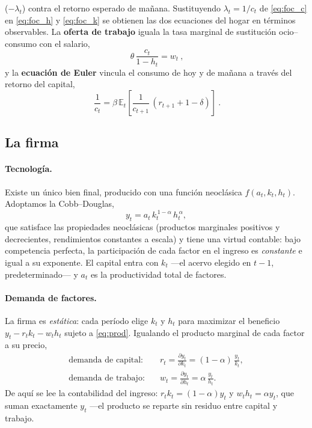 \documentclass[11pt,a4paper]{report}
\newcommand{\E}{\mathbb{E}}
\begin{document}
($-\lambda_t$) contra el retorno esperado de mañana. Sustituyendo $\lambda_t=1/c_t$ de
\eqref{eq:foc_c} en \eqref{eq:foc_h} y \eqref{eq:foc_k} se obtienen las dos ecuaciones
del hogar en términos observables. La \textbf{oferta de trabajo} iguala la tasa
marginal de sustitución ocio--consumo con el salario,
\begin{equation}
\boxed{\ \theta\,\frac{c_t}{1-h_t}=w_t\ }, \label{eq:laborsupply}
\end{equation}
y la \textbf{ecuación de Euler} vincula el consumo de hoy y de mañana a través del
retorno del capital,
\begin{equation}
\boxed{\ \frac{1}{c_t}=\beta\,\E_t\!\left[\frac{1}{c_{t+1}}\,(r_{t+1}+1-\delta)\right]\ }. \label{eq:euler}
\end{equation}

\subsection{La firma}
\label{sec:firma}

\paragraph{Tecnología.} Existe un único bien final, producido con una función
neoclásica $f(a_t,k_t,h_t)$. Adoptamos la Cobb--Douglas,
\begin{equation}
y_t = a_t\, k_t^{\,1-\alpha}\, h_t^{\,\alpha},
\label{eq:prod}
\end{equation}
que satisface las propiedades neoclásicas (productos marginales positivos y
decrecientes, rendimientos constantes a escala) y tiene una virtud contable: bajo
competencia perfecta, la participación de cada factor en el ingreso es \emph{constante}
e igual a su exponente. El capital entra con $k_t$ ---el acervo elegido en $t-1$,
predeterminado--- y $a_t$ es la productividad total de factores.

\paragraph{Demanda de factores.} La firma es \emph{estática}: cada período elige $k_t$
y $h_t$ para maximizar el beneficio $y_t-r_t k_t-w_t h_t$ sujeto a \eqref{eq:prod}.
Igualando el producto marginal de cada factor a su precio,
\begin{align}
\text{demanda de capital:}&\quad r_t=\frac{\partial y_t}{\partial k_t}=(1-\alpha)\,\frac{y_t}{k_t}, \label{eq:kdemand}\\[2pt]
\text{demanda de trabajo:}&\quad w_t=\frac{\partial y_t}{\partial h_t}=\alpha\,\frac{y_t}{h_t}. \label{eq:ldemand}
\end{align}
De aquí se lee la contabilidad del ingreso: $r_t k_t=(1-\alpha)y_t$ y
$w_t h_t=\alpha y_t$, que suman exactamente $y_t$ ---el producto se reparte sin
residuo entre capital y trabajo.
\end{document}
